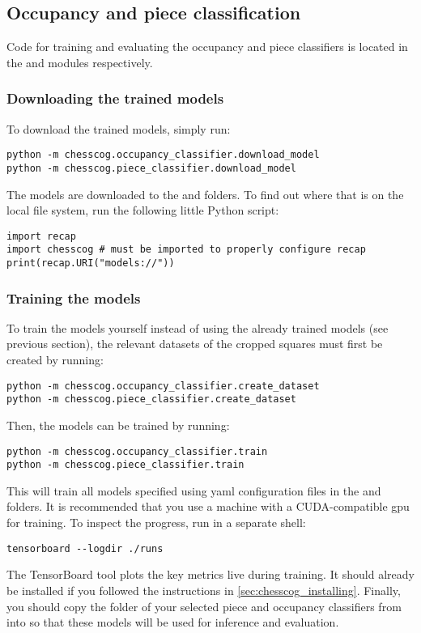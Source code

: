 \documentclass[../../report.tex]{subfiles}
\begin{document}
\subsection{Occupancy and piece classification}
Code for training and evaluating the occupancy and piece classifiers is located in the  and  modules respectively.
\subsubsection{Downloading the trained models}
\label{sec:chesscog_user_man_download_models}
To download the trained models, simply run:
\begin{verbatim}
python -m chesscog.occupancy_classifier.download_model
python -m chesscog.piece_classifier.download_model
\end{verbatim}
The models are downloaded to the  and  folders.
To find out where that is on the local file system, run the following little Python script:
\begin{verbatim}
import recap
import chesscog # must be imported to properly configure recap
print(recap.URI("models://"))
\end{verbatim}
\subsubsection{Training the models}
\label{sec:chesscog_user_man_train}
To train the models yourself instead of using the already trained models (see previous section), the relevant datasets of the cropped squares must first be created by running:
\begin{verbatim}
python -m chesscog.occupancy_classifier.create_dataset
python -m chesscog.piece_classifier.create_dataset
\end{verbatim}
Then, the models can be trained by running:
\begin{verbatim}
python -m chesscog.occupancy_classifier.train
python -m chesscog.piece_classifier.train
\end{verbatim}
This will train all models specified using \gls{yaml} configuration files in the  and  folders.
It is recommended that you use a machine with a CUDA-compatible \gls{gpu} for training.
To inspect the progress, run in a separate shell:
\begin{verbatim}
tensorboard --logdir ./runs
\end{verbatim}
The TensorBoard tool plots the key metrics live during training.
It should already be installed if you followed the instructions in \cref{sec:chesscog_installing}.
Finally, you should copy the folder of your selected piece and occupancy classifiers from  into  so that these models will be used for inference and evaluation.
\end{document}
